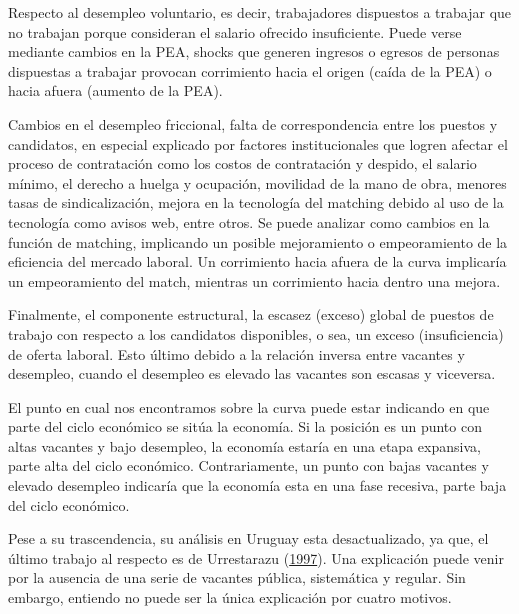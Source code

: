 \documentclass[12pt,twoside]{reedthesis}
\begin{document}
Respecto al desempleo voluntario, es decir, trabajadores dispuestos a trabajar que no trabajan porque consideran el salario ofrecido insuficiente. Puede verse mediante cambios en la PEA, shocks que generen ingresos o egresos de personas dispuestas a trabajar provocan corrimiento hacia el origen (caída de la PEA) o hacia afuera (aumento de la PEA).

Cambios en el desempleo friccional, falta de correspondencia entre los puestos y candidatos, en especial explicado por factores institucionales que logren afectar el proceso de contratación como los costos de contratación y despido, el salario mínimo, el derecho a huelga y ocupación, movilidad de la mano de obra, menores tasas de sindicalización, mejora en la tecnología del matching debido al uso de la tecnología como avisos web, entre otros. Se puede analizar como cambios en la función de matching, implicando un posible mejoramiento o empeoramiento de la eficiencia del mercado laboral. Un corrimiento hacia afuera de la curva implicaría un empeoramiento del match, mientras un corrimiento hacia dentro una mejora.

Finalmente, el componente estructural, la escasez (exceso) global de puestos de trabajo con respecto a los candidatos disponibles, o sea, un exceso (insuficiencia) de oferta laboral. Esto último debido a la relación inversa entre vacantes y desempleo, cuando el desempleo es elevado las vacantes son escasas y viceversa.

El punto en cual nos encontramos sobre la curva puede estar indicando en que parte del ciclo económico se sitúa la economía. Si la posición es un punto con altas vacantes y bajo desempleo, la economía estaría en una etapa expansiva, parte alta del ciclo económico. Contrariamente, un punto con bajas vacantes y elevado desempleo indicaría que la economía esta en una fase recesiva, parte baja del ciclo económico.

Pese a su trascendencia, su análisis en Uruguay esta desactualizado, ya que, el último trabajo al respecto es de Urrestarazu (\protect\hyperlink{ref-Urrestarazu1997}{1997}). Una explicación puede venir por la ausencia de una serie de vacantes pública, sistemática y regular. Sin embargo, entiendo no puede ser la única explicación por cuatro motivos.
\end{document}
